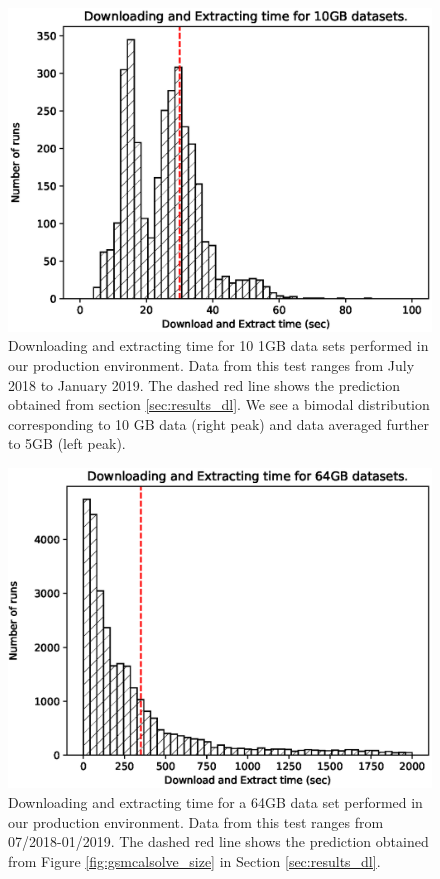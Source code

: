 \begin{figure}
    \includegraphics[width=0.95\linewidth]{figures/Production_10GB_2.eps}
      \caption{Downloading and extracting time for 10 1GB data sets performed in our production environment. Data from this test ranges from July 2018 to January 2019. The dashed red line shows the prediction obtained from section \ref{sec:results_dl}. We see a bimodal distribution corresponding to 10 GB data (right peak) and data averaged further to 5GB (left peak).}
	\label{fig:prod_dl_10}
\end{figure}


\begin{figure}
    \includegraphics[width=0.95\linewidth]{figures/Production_64GB_2.eps}
      \caption{Downloading and extracting time for a 64GB data set performed in our production environment. Data from this test ranges from 07/2018-01/2019. The dashed red line shows the prediction obtained from Figure \ref{fig:gsmcalsolve_size} in Section \ref{sec:results_dl}. }
	\label{fig:prod_dl_64}
\end{figure}


